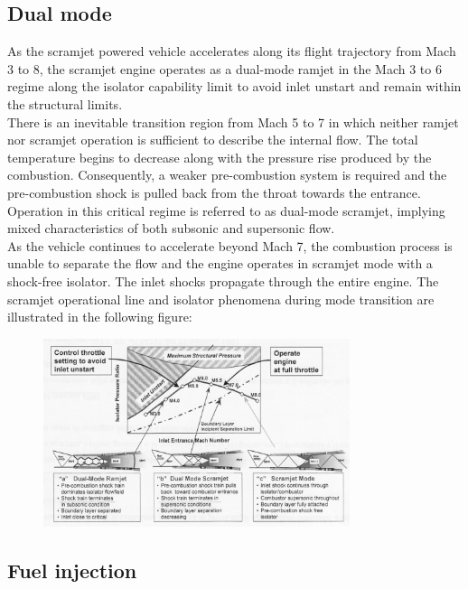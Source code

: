 \documentclass[12pt]{article}
\begin{document}
\subsection{Dual mode}

As the scramjet powered vehicle accelerates along its flight trajectory from Mach 3 to 8, the scramjet engine operates as a dual-mode ramjet in the Mach 3 to 6 regime along the isolator capability limit to avoid inlet unstart and remain within the structural limits.\\
There is an inevitable transition region from Mach 5 to 7 in which neither ramjet nor scramjet operation is sufficient to describe the internal flow. The total temperature begins to decrease along with the pressure rise produced by the combustion. Consequently, a weaker pre-combustion system is required and the pre-combustion shock is pulled back from the throat towards the entrance. Operation in this critical regime is referred to as dual-mode scramjet, implying mixed characteristics of both subsonic and supersonic flow.\\
As the vehicle continues to accelerate beyond Mach 7, the combustion process is unable to separate the flow and the engine operates in scramjet mode with a shock-free isolator. The inlet shocks propagate through the entire engine. The scramjet operational line and isolator phenomena during mode transition are illustrated in the following figure:

\begin{figure}[h!]
\centering
\includegraphics[width=0.8\textwidth]{figures/dualmode.png}
\end{figure}

\subsection{Fuel injection}
\end{document}
